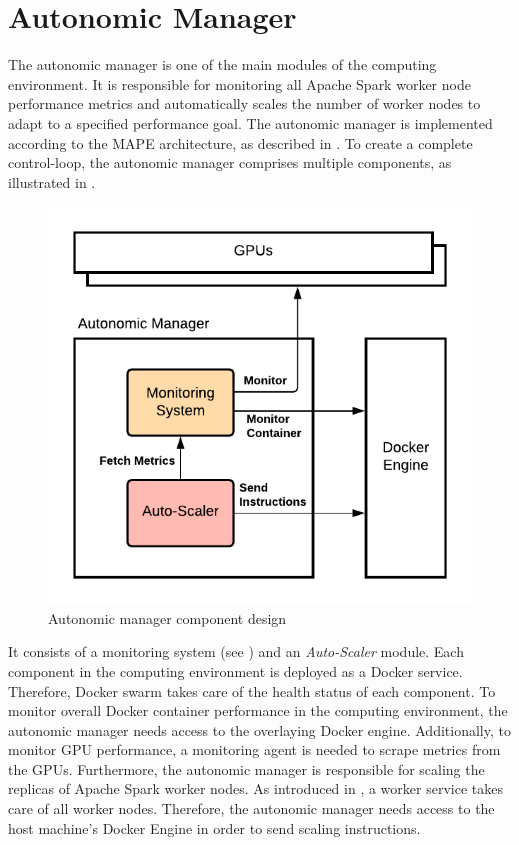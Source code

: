 \section{Autonomic Manager}
\label{05_am}
The autonomic manager is one of the main modules of the computing environment.
It is responsible for monitoring all Apache Spark worker node performance metrics and automatically scales the number of worker nodes to adapt to a specified performance goal.
The autonomic manager is implemented according to the MAPE architecture, as described in . To create a complete control-loop, the autonomic manager comprises multiple components, as illustrated in .
\label{subsec:05_am}
\begin{figure}[h]
\centering
\includegraphics[scale=1]{images/05_conceptual_design/autonomic_manager/autonomic_manager_concept}
\caption{Autonomic manager component design}
\label{fig:05_am_concept}
\end{figure}
It consists of a monitoring system (see ) and an \textit{Auto-Scaler} module.
Each component in the computing environment is deployed as a Docker service. Therefore, Docker swarm takes care of the health status of each component.
To monitor overall Docker container performance in the computing environment, the autonomic manager needs access to the overlaying Docker engine. Additionally, to monitor GPU performance, a monitoring agent is needed to scrape metrics from the GPUs.
Furthermore, the autonomic manager is responsible for scaling the replicas of Apache Spark worker nodes. As introduced in , a worker service takes care of all worker nodes. Therefore, the autonomic manager needs access to the host machine's Docker Engine in order to send scaling instructions.



